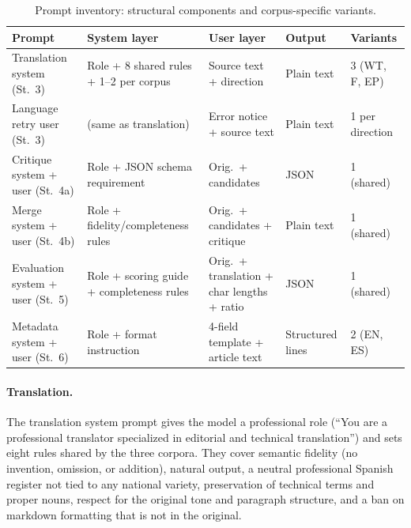 \documentclass[11pt]{article}
\begin{document}
\begin{table}[h!]
\centering
\caption{Prompt inventory: structural components and corpus-specific variants.}
\label{tabS:prompts}
\renewcommand{\arraystretch}{1.15}
\scriptsize
\begin{tabularx}{\textwidth}{@{}p{2.6cm}XXp{1.5cm}p{1.8cm}@{}}
\toprule
\textbf{Prompt} & \textbf{System layer} & \textbf{User layer} & \textbf{Output} & \textbf{Variants} \\
\midrule
Translation system (St.~3)      & Role + 8 shared rules + 1--2 per corpus   & Source text + direction                     & Plain text       & 3 (WT, F, EP) \\
Language retry user (St.~3)     & (same as translation)                     & Error notice + source text                  & Plain text       & 1 per direction \\
\midrule
Critique system + user (St.~4a) & Role + JSON schema requirement            & Orig.\ + candidates                         & JSON             & 1 (shared) \\
Merge system + user (St.~4b)    & Role + fidelity/completeness rules        & Orig.\ + candidates + critique              & Plain text       & 1 (shared) \\
\midrule
Evaluation system + user (St.~5) & Role + scoring guide + completeness rules & Orig.\ + translation + char lengths + ratio & JSON            & 1 (shared) \\
\midrule
Metadata system + user (St.~6)  & Role + format instruction                 & 4-field template + article text             & Structured lines & 2 (EN, ES) \\
\bottomrule
\end{tabularx}
\renewcommand{\arraystretch}{1}
\end{table}

\paragraph{Translation.} The translation system prompt gives the model a professional role (``You are a professional translator specialized in editorial and technical translation'') and sets eight rules shared by the three corpora. They cover semantic fidelity (no invention, omission, or addition), natural output, a neutral professional Spanish register not tied to any national variety, preservation of technical terms and proper nouns, respect for the original tone and paragraph structure, and a ban on markdown formatting that is not in the original.
\end{document}

